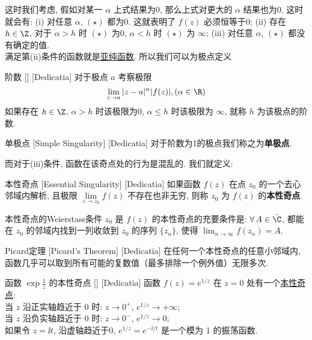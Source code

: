\documentclass[UTF8]{ctexart}
\newcommand{\MeromorphicFunction}{\hyperref[dfn:MeromorphicFunction]{亚纯函数}}
\newcommand{\EssentialSingularity}{\hyperref[dfn:EssentialSingularity]{本性奇点}}
\begin{document}
这时我们考虑, 假如对某一 \( \alpha \) 上式结果为0, 那么上式对更大的 \( \alpha \) 结果也为0. 这时就会有: (i) 对任意 \( \alpha \),  \( (\star) \) 都为0. 这就表明了 \( f(z) \) 必须恒等于0; (ii) 存在 \( h\in\Z \), 对于 \( \alpha>h \) 时 \( (\star) \) 为0,  \( \alpha<h \) 时 \( (\star) \) 为 \( \infty \); (iii) 对任意 \( \alpha \),  \( (\star) \) 都没有确定的值. \\
满足第(ii)条件的函数就是\MeromorphicFunction. 所以我们可以为极点定义
\begin{dfn}
    [UUID]
    {阶数}
    []
    [Dedicatia]
    对于极点 \( a \) 考察极限
    \[\lim_{z\to a}|z-a|^\alpha |f(z)|, (\alpha\in\R)\]
    如果存在 \( h\in\Z \),  \( \alpha>h \) 时该极限为0,  \( \alpha\leq h \) 时该极限为 \( \infty \), 就称 \( h \) 为该极点的阶数. 
\end{dfn}
\begin{dfn}
    [SimpleSingularity]
    {单极点}
    [Simple Singularity]
    [Dedicatia]
    对于阶数为1的极点我们称之为\textbf{单极点}. 
\end{dfn}
而对于(iii)条件, 函数在该奇点处的行为是混乱的. 我们就定义: 
\begin{dfn}
    [EssentialSingularity]
    {本性奇点}
    [Essential Singularity]
    [Dedicatia]
    如果函数 \( f(z) \) 在点 \( z_0 \) 的一个去心邻域内解析, 且极限 \( \lim\limits_{z \to z_0} f(z) \) 不存在也非无穷, 则称 \( z_0 \) 为 \( f(z) \) 的\textbf{本性奇点}. 
\end{dfn}
\begin{thm}
    {本性奇点的Weierstass条件}
     \( z_0 \) 是 \( f(z) \) 的本性奇点的充要条件是:  \( \forall\,A\in\hat{\C} \), 都能在 \( z_0 \) 的邻域内找到一列收敛到 \( z_0 \) 的序列 \( \{z_n\} \), 使得 \( \lim_{n\to\infty}f(z_n)=A \).
\end{thm}
\begin{thm}
    [UUID]
    {Picard定理}
    [Picard's Theorem]
    [Dedicatia]
    在任何一个本性奇点的任意小邻域内, 函数几乎可以取到所有可能的复数值（最多排除一个例外值）无限多次. 
\end{thm}
\begin{xmp}
    [UUID]
    {函数 \( \exp\frac{1}{z} \) 的本性奇点}
    []
    [Dedicatia]
    函数 \( f(z) = e^{1/z} \) 在 \( z=0 \) 处有一个\EssentialSingularity :\\
    当 \( z \) 沿正实轴趋近于 0 时: \( z \to 0^+ \), \( e^{1/z} \to +\infty \);\\ 
    当 \( z \) 沿负实轴趋近于 0 时: \( z \to 0^- \), \( e^{1/z} \to 0 \);\\
    如果令 \( z =\ii t \), 沿虚轴趋近于0, \( e^{1/z} = e^{-\ii/t} \) 是一个模为 1 的振荡函数.
\end{xmp}
\end{document}
